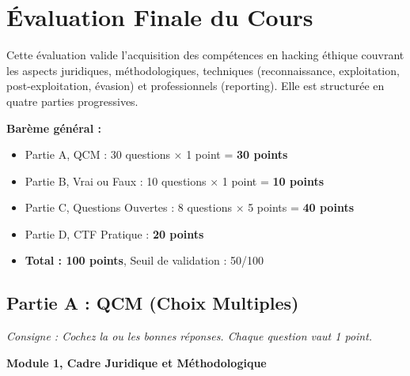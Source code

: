 

\chapter{Évaluation Finale du Cours}
\label{chap:evaluation}

Cette évaluation valide l'acquisition des compétences en hacking éthique
couvrant les aspects juridiques, méthodologiques, techniques (reconnaissance,
exploitation, post-exploitation, évasion) et professionnels (reporting).
Elle est structurée en quatre parties progressives.

\begin{boxinfo}
\textbf{Barème général :}
\begin{itemize}
    \item Partie A, QCM : 30 questions × 1 point = \textbf{30 points}
    \item Partie B, Vrai ou Faux : 10 questions × 1 point = \textbf{10 points}
    \item Partie C, Questions Ouvertes : 8 questions × 5 points = \textbf{40 points}
    \item Partie D, CTF Pratique : \textbf{20 points}
    \item \textbf{Total : 100 points}, Seuil de validation : 50/100
\end{itemize}
\end{boxinfo}

\section{Partie A : QCM (Choix Multiples)}
\label{sec:qcm}

\textit{Consigne : Cochez la ou les bonnes réponses. Chaque question vaut 1 point.}

\medskip
\noindent\textbf{Module 1, Cadre Juridique et Méthodologique}

